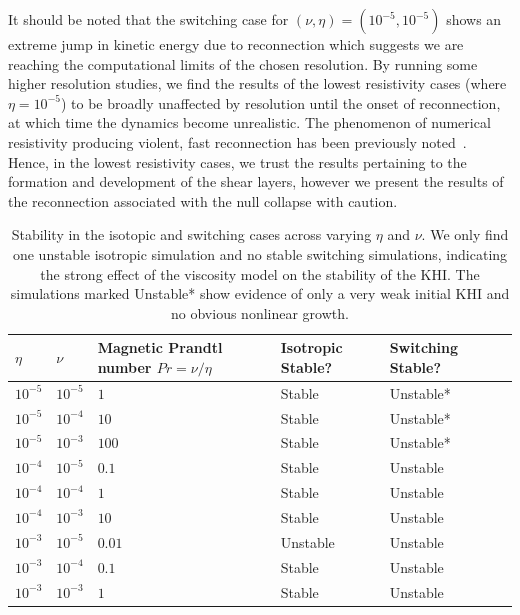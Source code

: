 It should be noted that the switching case for  $(\nu, \eta) = (10^{-5}, 10^{-5})$ shows an extreme jump in kinetic energy due to reconnection which suggests we are reaching the computational limits of the chosen resolution. By running some higher resolution studies, we find the results of the lowest resistivity cases (where $\eta = 10^{-5}$) to be broadly unaffected by resolution until the onset of reconnection, at which time the dynamics become unrealistic. The phenomenon of numerical resistivity producing violent, fast reconnection has been previously noted~\cite{miyamaNumericalAstrophysicsProceedings2012}. Hence, in the lowest resistivity cases, we trust the results pertaining to the formation and development of the shear layers, however we present the results of the reconnection associated with the null collapse with caution.

\begin{table}[]
\centering
\begin{tabular}{llllll}
$\eta$    & $\nu$    & Magnetic Prandtl number $Pr = \nu/\eta$ & Isotropic Stable? & Switching Stable? &  \\
\midrule
$10^{-5}$ & $10^{-5}$ & $1$ & Stable                 & Unstable*          &  \\
$10^{-5}$ & $10^{-4}$ & $10$ & Stable                 & Unstable*          &  \\
$10^{-5}$ & $10^{-3}$ & $100$ & Stable                 & Unstable*          &  \\
$10^{-4}$ & $10^{-5}$ & $0.1$ & Stable                 & Unstable                 &  \\
$10^{-4}$ & $10^{-4}$ & $1$ & Stable                 & Unstable                 &  \\
$10^{-4}$ & $10^{-3}$ & $10$ & Stable                 & Unstable                 &  \\
$10^{-3}$ & $10^{-5}$ & $0.01$ & Unstable                 & Unstable                 &  \\
$10^{-3}$ & $10^{-4}$ & $0.1$ & Stable                 & Unstable                 &  \\
$10^{-3}$ & $10^{-3}$ & $1$ & Stable                 & Unstable                 & 
\end{tabular}
\caption{Stability in the isotopic and switching cases across varying $\eta$ and $\nu$. We only find one unstable isotropic simulation and no stable switching simulations, indicating the strong effect of the viscosity model on the stability of the KHI. The simulations marked Unstable* show evidence of only a very weak initial KHI and no obvious nonlinear growth.}
\label{tab:stability}
\end{table}

